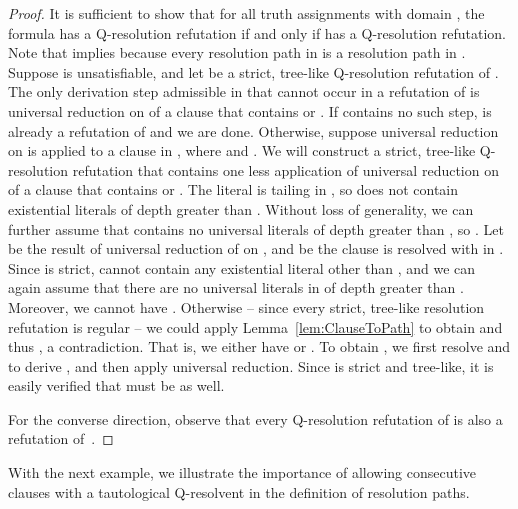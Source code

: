 \documentclass{llncs}
\newcommand{\longversion}[1]{#1}
\newcommand{\shortversion}[1]{}
\def\hy{\hbox{-}\nobreak\hskip0pt} \newcommand{\ellipsis}{}
\begin{document}
\longversion{\begin{proof} 
  \shortversion{\begin{sloppypar}} It is sufficient to show that for all truth
    assignments  with domain , the formula  has a Q\hy resolution
    refutation if and only if  has a Q\hy resolution
    refutation. Note that  implies  because every resolution path in  is a
    resolution path in .  
  \shortversion{\end{sloppypar}} Suppose
   is unsatisfiable, and let  be a strict, tree\hy like
  Q\hy resolution refutation of . The only derivation step
  admissible in  that cannot occur in a refutation of  is
  universal reduction on  of a clause that contains  or . If
   contains no such step,  is already a refutation of 
  and we are done. Otherwise, suppose universal reduction on  is applied to
  a clause  in , where  and . We will construct a strict,
  tree\hy like Q\hy resolution refutation  that contains one less
  application of universal reduction on  of a clause that contains  or
  . The literal  is tailing in , so  does not contain
  existential literals of depth greater than
  . Without loss of generality, we can further assume
  that  contains no universal literals of depth greater than
  , so . Let  be the result of universal reduction of  on , and  be the clause  is resolved with in
  . Since  is strict,  cannot contain any existential literal
  other than , and we can again assume that there are no
  universal literals in  of depth greater than
  . Moreover, we cannot have . Otherwise -- since every strict, tree\hy like resolution
  refutation is regular -- we could apply Lemma~\ref{lem:ClauseToPath} to
  obtain  and thus , a
  contradiction. That is, we either have 
  or . To obtain , we first resolve  and
   to derive , and then apply universal reduction. Since 
  is strict and tree\hy like, it is easily verified that  must be as
  well.

  For the converse direction, observe that every Q\hy resolution refutation of
   is also a refutation of~.
\end{proof}
 }
With the next example, we illustrate the importance of allowing consecutive
clauses with a tautological Q\hy resolvent in the definition of resolution
paths.
\end{document}
